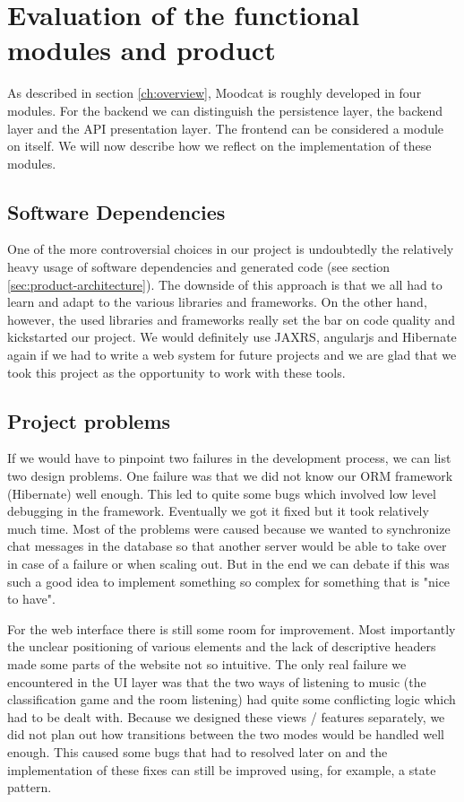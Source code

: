 
\chapter{Evaluation of the functional modules and product}
As described in section \ref{ch:overview}, Moodcat is roughly developed in four modules.
For the backend we can distinguish the persistence layer, the backend layer and the API presentation layer.
The frontend can be considered a module on itself.
We will now describe how we reflect on the implementation of these modules.

\section{Software Dependencies}
One of the more controversial choices in our project is undoubtedly the relatively heavy usage of software dependencies and generated code (see section \ref{sec:product-architecture}).
The downside of this approach is that we all had to learn and adapt to the various libraries and frameworks.
On the other hand, however, the used libraries and frameworks really set the bar on code quality and kickstarted our project.
We would definitely use \gls{JAXRS}, \gls{angularjs} and \gls{Hibernate} again if we had to write a web system for future projects and we are glad that we took this project as the opportunity to work with these tools.

\section{Project problems}
If we would have to pinpoint two failures in the development process, we can list two design problems.
One failure was that we did not know our \gls{ORM} framework (\gls{Hibernate}) well enough.
This led to quite some bugs which involved low level debugging in the framework.
Eventually we got it fixed but it took relatively much time.
Most of the problems were caused because we wanted to synchronize chat messages in the database so that another server would be able to take over in case of a failure or when scaling out.
But in the end we can debate if this was such a good idea to implement something so complex for something that is "nice to have".

For the web interface there is still some room for improvement.
Most importantly the unclear positioning of various elements and the lack of descriptive headers made some parts of the website not so intuitive.
The only real failure we encountered in the UI layer was that the two ways of listening to music (the classification game and the room listening) had quite some conflicting logic which had to be dealt with.
Because we designed these views / features separately, we did not plan out how transitions between the two modes would be handled well enough.
This caused some bugs that had to resolved later on and the implementation of these fixes can still be improved using, for example, a state pattern.

